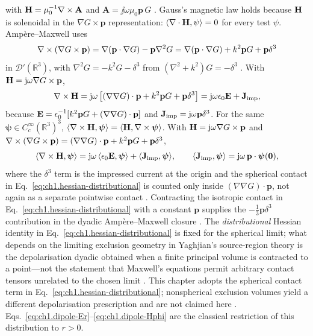 with $\mathbf{H}=\mu_0^{-1}\nabla\times\mathbf{A}$ and $\mathbf{A}=\jj\omega\mu_0\mathbf{p}\,G$ \cite{jackson1999,stratton1941}. Gauss's magnetic law holds because $\mathbf{H}$ is solenoidal in the $\nabla G\times\mathbf{p}$ representation: $\langle\nabla\cdot\mathbf{H},\psi\rangle=0$ for every test $\psi$. Amp\`ere--Maxwell uses
\[
\nabla\times(\nabla G\times\mathbf{p})
=\nabla(\mathbf{p}\cdot\nabla G)-\mathbf{p}\nabla^2 G
=\nabla(\mathbf{p}\cdot\nabla G)+k^2\mathbf{p}G+\mathbf{p}\delta^{3}
\]
in $\mathcal{D}'(\mathbb{R}^{3})$, with $\nabla^2G=-k^2G-\delta^{3}$ from $(\nabla^2+k^2)G=-\delta^{3}$ \cite{yaghjian1980dyadic,yaghjian1982}. With $\mathbf{H}=\mathrm{j}\omega\nabla G\times\mathbf{p}$,
\begin{equation}
\label{eq:ch1.dipole-ampere-distributional}
\nabla\times\mathbf{H}
=\mathrm{j}\omega\left[
(\nabla\nabla G)\cdot\mathbf{p}
+k^{2}\mathbf{p}G
+\mathbf{p}\delta^{3}
\right]
=\mathrm{j}\omega\epsilon_0\mathbf{E}+\mathbf{J}_{\mathrm{imp}},
\end{equation}
because $\mathbf{E}=\epsilon_0^{-1}[k^{2}\mathbf{p}G+(\nabla\nabla G)\cdot\mathbf{p}]$ and $\mathbf{J}_{\mathrm{imp}}=\mathrm{j}\omega\mathbf{p}\delta^{3}$. For the same $\boldsymbol\psi\in C_c^\infty(\mathbb{R}^{3})^{3}$, $\langle\nabla\times\mathbf{H},\boldsymbol\psi\rangle=\langle\mathbf{H},\nabla\times\boldsymbol\psi\rangle$. With $\mathbf{H}=\mathrm{j}\omega\nabla G\times\mathbf{p}$ and $\nabla\times(\nabla G\times\mathbf{p})=(\nabla\nabla G)\cdot\mathbf{p}+k^{2}\mathbf{p}G+\mathbf{p}\delta^{3}$,
\[
\langle\nabla\times\mathbf{H},\boldsymbol\psi\rangle
=\mathrm{j}\omega\,\langle\epsilon_0\mathbf{E},\boldsymbol\psi\rangle
+\langle\mathbf{J}_{\mathrm{imp}},\boldsymbol\psi\rangle,
\qquad
\langle\mathbf{J}_{\mathrm{imp}},\boldsymbol\psi\rangle=\mathrm{j}\omega\,\mathbf{p}\cdot\boldsymbol\psi(\mathbf{0}),
\]
where the $\delta^{3}$ term is the impressed current at the origin and the spherical contact in Eq.~\eqref{eq:ch1.hessian-distributional} is counted only inside $(\nabla\nabla G)\cdot\mathbf{p}$, not again as a separate pointwise contact \cite{yaghjian1980dyadic,yaghjian1982,jackson1999}. Contracting the isotropic contact in Eq.~\eqref{eq:ch1.hessian-distributional} with a constant $\mathbf{p}$ supplies the $-\tfrac13\mathbf{p}\delta^{3}$ contribution in the dyadic Amp\`ere--Maxwell closure \cite{yaghjian1980dyadic,yaghjian1982}. The \emph{distributional} Hessian identity in Eq.~\eqref{eq:ch1.hessian-distributional} is fixed for the spherical limit; what depends on the limiting exclusion geometry in Yaghjian's source-region theory is the depolarisation dyadic obtained when a finite principal volume is contracted to a point---not the statement that Maxwell's equations permit arbitrary contact tensors unrelated to the chosen limit \cite{yaghjian1980dyadic,yaghjian1982}. This chapter adopts the spherical contact term in Eq.~\eqref{eq:ch1.hessian-distributional}; nonspherical exclusion volumes yield a different depolarisation prescription and are not claimed here \cite{yaghjian1980dyadic,yaghjian1982}. Eqs.~\eqref{eq:ch1.dipole-Er}--\eqref{eq:ch1.dipole-Hphi} are the classical restriction of this distribution to $r>0$.
